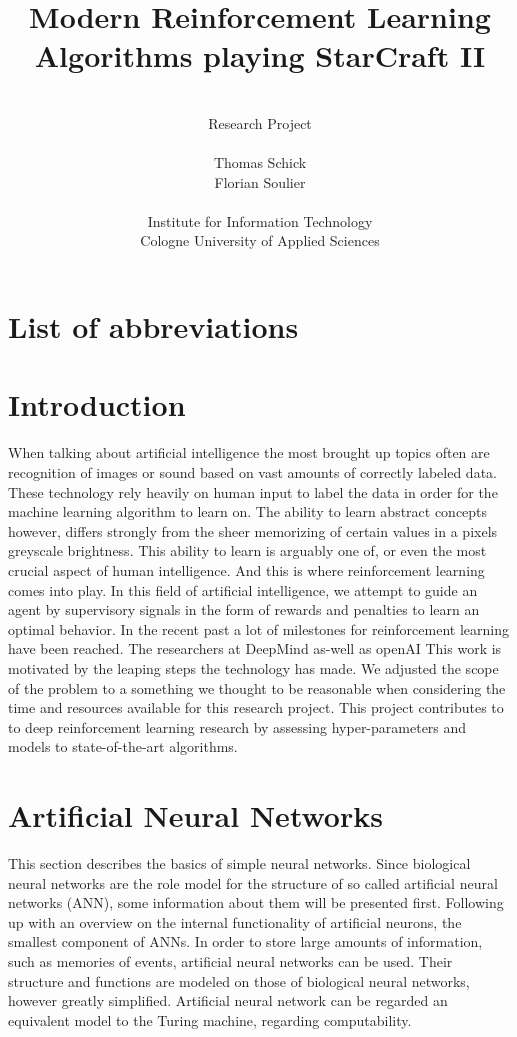 \documentclass[12pt,a4paper]{article}
\author{\\Research Project\\ \\Thomas Schick\\Florian Soulier\\ \\ Institute for Information Technology\\
Cologne University of Applied Sciences}
\title{Modern Reinforcement Learning Algorithms playing StarCraft II}
\begin{document}
\noindent

\newpage
\tableofcontents{}
\newpage
\section*{List of abbreviations}

\newpage
{}
\section{Introduction} 
When talking about artificial intelligence the most brought up topics often are recognition of images or sound based on vast amounts of correctly labeled data.
These technology rely heavily on human input to label the data in order for the machine learning algorithm to learn on.
The ability to learn abstract concepts however, differs strongly from the sheer memorizing of certain values in a pixels greyscale brightness.
This ability to learn is arguably one of, or even the most crucial aspect of human intelligence. And this is where reinforcement learning comes into play.
In this field of artificial intelligence, we attempt to guide an agent by supervisory signals in the form of rewards and penalties to learn an optimal behavior.
In the recent past a lot of milestones for reinforcement learning have been reached. The researchers at DeepMind as-well as openAI
This work is motivated by the leaping steps the technology has made.
We adjusted the scope of the problem to a something we thought to be reasonable when considering the time and resources available for this research project. 
This project contributes to to deep reinforcement learning research by assessing hyper-parameters and models to state-of-the-art algorithms.
\section{Artificial Neural Networks}
This section describes the basics of simple neural networks. Since biological neural networks are the role model for the structure of so called artificial neural networks (ANN), some information about them will be presented first.
Following up with an overview on the internal functionality of artificial neurons, the smallest component of ANNs.
In order to store large amounts of information, such as memories of events, artificial neural networks can be used. Their structure and functions are modeled on those of biological neural networks, however greatly simplified.
Artificial neural network can be regarded an equivalent model to the Turing machine, regarding computability.
\end{document}
